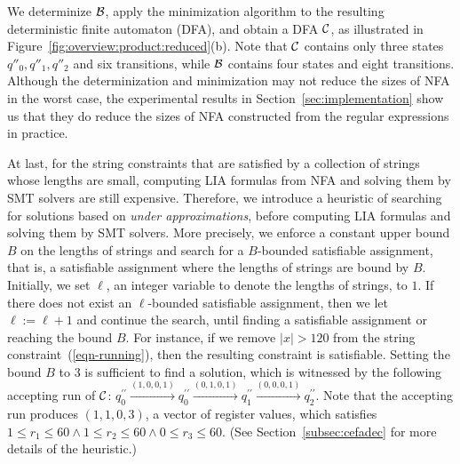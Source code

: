 We determinize $\mathcal{B}$, apply the minimization algorithm to the resulting deterministic finite automaton (DFA), and obtain a DFA $\mathcal{C}$, as illustrated in Figure~\ref{fig:overview:product:reduced}(b). 
Note that $\mathcal{C}$ contains only three states $q''_0, q''_1, q''_2$ and six transitions, while $\mathcal{B}$ contains four states and eight transitions. 
Although the determinization and minimization may not reduce the sizes of NFA in the worst case, the experimental results in Section~\ref{sec:implementation} show us that they do reduce the sizes of NFA constructed from the regular expressions in practice. 


At last, for the string constraints that are satisfied by a collection of strings whose lengths are small, computing LIA formulas from NFA and solving them by SMT solvers are still expensive.  
Therefore, we introduce a heuristic of searching for solutions based on \emph{under approximations}, before computing LIA formulas and solving them by SMT solvers. More precisely, we enforce a constant upper bound $B$ on the lengths of strings and search for a $B$-bounded satisfiable assignment, that is, a satisfiable assignment where the lengths of strings are bound by $B$. Initially, we set $\ell$, an integer variable to denote the lengths of strings, to $1$. If there does not exist an $\ell$-bounded satisfiable assignment, then we let $\ell:=\ell+1$ and continue the search, until finding a satisfiable assignment or reaching the bound $B$. For instance, if we remove $|x| > 120$ from the string constraint~(\ref{eqn-running}), then the resulting constraint is satisfiable. Setting the bound $B$ to $3$ is sufficient to find a solution, which is witnessed by the following accepting run of $\mathcal{C}$: $q^{\prime\prime}_0 \xrightarrow{(1,0,0,1)} q^{\prime\prime}_0 \xrightarrow{(0,1,0,1)} q^{\prime\prime}_1 \xrightarrow{(0,0,0,1)} q^{\prime\prime}_2$. Note that the accepting run produces $(1,1,0,3)$, a vector of register values,  which satisfies $1 \le r_1 \le 60 \wedge 1 \le r_2 \le 60 \wedge 0 \le r_3 \le 60$. (See Section~\ref{subsec:cefadec} for more details of the heuristic.)


